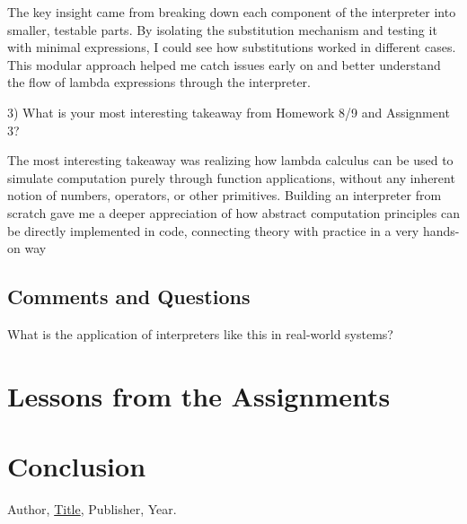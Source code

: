 \documentclass{article}
\theoremstyle{theorem}
\theoremstyle{definition}
\theoremstyle{remark}
\begin{document}
The key insight came from breaking down each component of the interpreter into smaller, testable parts. By isolating the substitution mechanism and testing it with minimal expressions, I could see how substitutions worked in different cases. This modular approach helped me catch issues early on and better understand the flow of lambda expressions through the interpreter.

3) What is your most interesting takeaway from Homework 8/9 and Assignment 3?

The most interesting takeaway was realizing how lambda calculus can be used to simulate computation purely through function applications, without any inherent notion of numbers, operators, or other primitives. Building an interpreter from scratch gave me a deeper appreciation of how abstract computation principles can be directly implemented in code, connecting theory with practice in a very hands-on way

\subsection*{Comments and Questions}

What is the application of interpreters like this in real-world systems?


\section{Lessons from the Assignments}


\section{Conclusion}\label{conclusion}


\begin{thebibliography}{99}
 Author, \href{https://en.wikipedia.org/wiki/LaTeX}{Title}, Publisher, Year.
\end{thebibliography}
\end{document}
